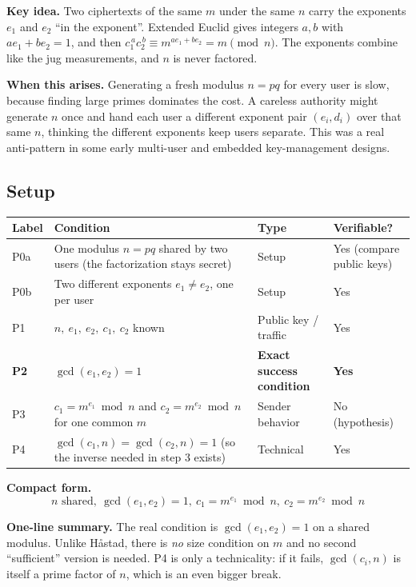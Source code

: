 \documentclass[11pt]{article}
\begin{document}
\textbf{Key idea.} Two ciphertexts of the same $m$ under the same $n$ carry the exponents $e_1$ and $e_2$ ``in the exponent''. Extended Euclid gives integers $a,b$ with $ae_1+be_2=1$, and then $c_1^{\,a}c_2^{\,b}\equiv m^{ae_1+be_2}=m\pmod n$. The exponents combine like the jug measurements, and $n$ is never factored.

\textbf{When this arises.} Generating a fresh modulus $n=pq$ for every user is slow, because finding large primes dominates the cost. A careless authority might generate $n$ once and hand each user a different exponent pair $(e_i,d_i)$ over that same $n$, thinking the different exponents keep users separate. This was a real anti-pattern in some early multi-user and embedded key-management designs.

\subsection*{Setup}
\begin{center}
\begin{tabular}{@{}>{\raggedright\arraybackslash}p{1.1cm}>{\raggedright\arraybackslash}p{7.9cm}>{\raggedright\arraybackslash}p{3.4cm}>{\raggedright\arraybackslash}p{2.6cm}@{}}
\toprule
\textbf{Label} & \textbf{Condition} & \textbf{Type} & \textbf{Verifiable?} \\
\midrule
P0a & One modulus $n=pq$ shared by two users (the factorization stays secret) & Setup & Yes (compare public keys) \\
P0b & Two different exponents $e_1\ne e_2$, one per user & Setup & Yes \\
P1 & $n,\ e_1,\ e_2,\ c_1,\ c_2$ known & Public key / traffic & Yes \\
\textbf{P2} & \textbf{$\gcd(e_1,e_2)=1$} & \textbf{Exact success condition} & \textbf{Yes} \\
P3 & $c_1=m^{e_1}\bmod n$ and $c_2=m^{e_2}\bmod n$ for one common $m$ & Sender behavior & No (hypothesis) \\
P4 & $\gcd(c_1,n)=\gcd(c_2,n)=1$ (so the inverse needed in step 3 exists) & Technical & Yes \\
\bottomrule
\end{tabular}
\end{center}

\textbf{Compact form.}
\[
\boxed{\;n\text{ shared},\ \gcd(e_1,e_2)=1,\ c_1=m^{e_1}\bmod n,\ c_2=m^{e_2}\bmod n\;}
\]

\textbf{One-line summary.} The real condition is $\gcd(e_1,e_2)=1$ on a shared modulus. Unlike Håstad, there is \emph{no} size condition on $m$ and no second ``sufficient'' version is needed. P4 is only a technicality: if it fails, $\gcd(c_i,n)$ is itself a prime factor of $n$, which is an even bigger break.
\end{document}
